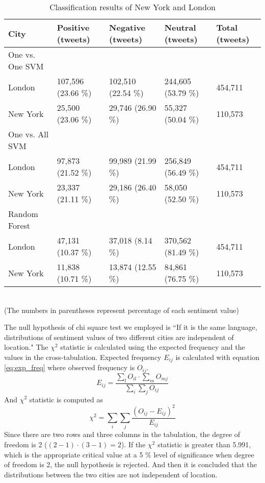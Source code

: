 \begin{table}[ht]
	\caption{Classification results of New York and London}
	\begin{tabular}{|l|p{1.8cm}|p{1.8cm}|p{1.8cm}|p{1.8cm}|} \hline
	City&Positive (tweets)&Negative (tweets)&Neutral (tweets)&Total (tweets)\\ \hline
	One vs. One SVM & {} & {} & {} & {}\\ \hline
London & 107,596 (23.66 \%) & 102,510 (22.54 \%) & 244,605 (53.79 \%)& 454,711 \\ \hline
New York & 25,500 (23.06 \%) & 29,746 (26.90 \%)& 55,327 (50.04 \%)& 110,573 \\ \hline
	One vs. All SVM & {} & {} & {} & {}\\ \hline

London & 97,873 (21.52 \%) & 99,989 (21.99 \%) & 256,849 (56.49 \%)& 454,711 \\ \hline

New York & 23,337 (21.11 \%)& 29,186 (26.40 \%)& 58,050 (52.50 \%)& 110,573 \\ \hline
	Random Forest & {} & {} & {} & {}\\ \hline

London & 47,131 (10.37 \%)  & 37,018 (8.14 \%)  & 370,562 (81.49 \%) & 454,711 \\ \hline

New York  & 11,838 (10.71 \%)& 13,874 (12.55 \%)& 84,861 (76.75 \%)& 110,573 \\ \hline
	\end{tabular}
	\label{tab:result_london_ny}
	\\(The numbers in parentheses represent percentage of each sentiment value)
\end{table}

The null hypothesis of chi square test we employed is ``If it is the same language, distributions of sentiment values of two different cities are independent of location."
The $\chi^2$ statistic is calculated using the expected frequency and the values in the cross-tabulation.
Expected frequency $E_{ij}$ is calculated with equation \ref{eq:exp_freq} where observed frequency is $O_{ij}$.
\begin{equation}
E_{ij} = \frac{\sum_{l} O_{il} \cdot \sum_{m} O_{mj}}{\sum_{i} \sum_{j} O_{ij}}
\label{eq:exp_freq}
\end{equation}
And $\chi^2$ statistic is computed as 
\begin{equation}
\chi^2 = \sum_{i} \sum_{j} \frac{(O_{ij} - E_{ij})^2}{E_{ij}}
\end{equation}
Since there are two rows and three columns in the tabulation, the degree of freedom is 2 ($(2 - 1 ) \cdot  (3 - 1) = 2$).
If the $\chi^2$ statistic is greater than 5.991, which is the appropriate critical value at a 5 \% level of significance when degree of freedom is 2, the null hypothesis is rejected.
And then it is concluded that the distributions between the two cities are not independent of location. 


